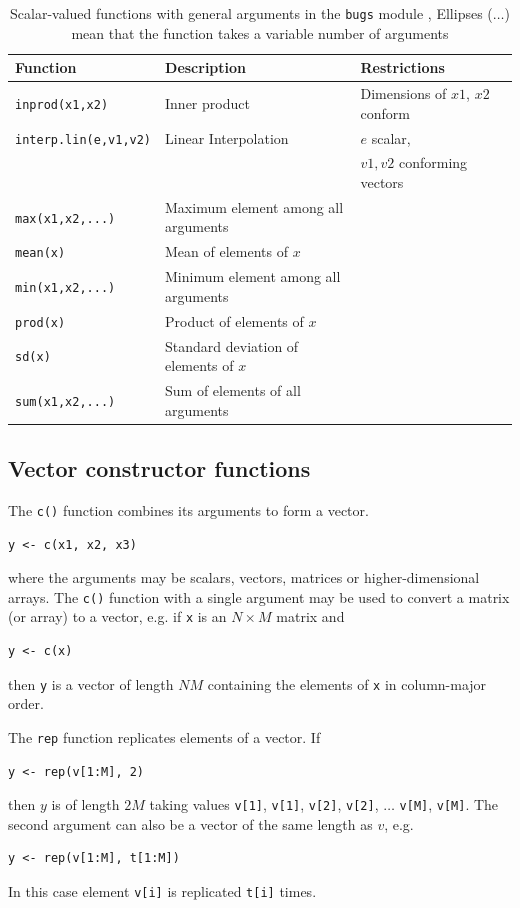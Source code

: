 \documentclass[11pt, a4paper, titlepage]{report}
\begin{document}
\begin{table}
\begin{tabular}{lll}
\hline
Function & Description & Restrictions \\
\hline
\verb+inprod(x1,x2)+ & Inner product & Dimensions of $x1$, $x2$ conform \\
\verb+interp.lin(e,v1,v2)+ & Linear Interpolation & $e$ scalar, \\
                          &                     & $v1,v2$ conforming vectors \\
\verb+max(x1,x2,...)+ & Maximum element among all arguments & \\
\verb+mean(x)+  & Mean of elements of $x$ & \\
\verb+min(x1,x2,...)+ & Minimum element among all arguments & \\
\verb+prod(x)+  & Product of elements of $x$ & \\
\verb+sd(x)+    & Standard deviation of elements of $x$ & \\
\verb+sum(x1,x2,...)+   & Sum of elements of all arguments & \\
\hline
\end{tabular}
\caption{Scalar-valued functions with general
  arguments in the \texttt{bugs} module \label{table:bugs:scalar2},
  Ellipses ($\ldots$) mean that the function takes a variable number of
  arguments}
\end{table}

\subsection{Vector constructor functions}

The \verb+c()+ function combines its arguments to form a vector.
\begin{verbatim}
y <- c(x1, x2, x3)
\end{verbatim}
where the arguments may be scalars, vectors, matrices or
higher-dimensional arrays. The \verb+c()+ function with a single
argument may be used to convert a matrix (or array) to a vector, e.g.
if \texttt{x} is an $N \times M$ matrix and
\begin{verbatim}
y <- c(x)
\end{verbatim}
then \texttt{y} is a vector of length $NM$ containing the elements of
\texttt{x} in column-major order.

The \texttt{rep} function replicates elements of a vector. If
\begin{verbatim}
y <- rep(v[1:M], 2)
\end{verbatim}
then $y$ is of length $2M$ taking values \verb+v[1]+, \verb+v[1]+,
\verb+v[2]+, \verb+v[2]+, $\ldots$ \verb+v[M]+, \verb+v[M]+.
The second argument can also be a vector of the same length as $v$,
e.g.
\begin{verbatim}
y <- rep(v[1:M], t[1:M])
\end{verbatim}
In this case element \verb+v[i]+ is replicated \verb+t[i]+ times.
\end{document}
